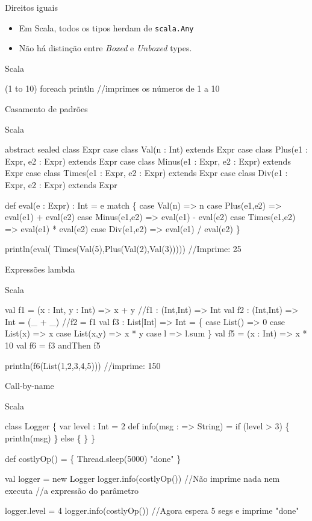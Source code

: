 \documentclass[12pt]{beamer}
\newenvironment{scala}{
\begin{block}{Scala} \begin{semiverbatim}
}{
\end{semiverbatim} \end{block}
}
\begin{document}
\begin{frame}[fragile]{Direitos iguais}
\begin{itemize}
\item Em Scala, todos os tipos herdam de \texttt{scala.Any}
\pause
\item Não há distinção entre \emph{Boxed} e \emph{Unboxed} types.
\end{itemize}
\pause
\begin{scala}
(1 to 10) foreach println
//imprimes os números de 1 a 10
\end{scala}
\end{frame}

\begin{frame}[fragile]{Casamento de padrões}
\scriptsize
\begin{scala}
abstract sealed class Expr
case class Val(n : Int) extends Expr
case class Plus(e1 : Expr, e2 : Expr) extends Expr
case class Minus(e1 : Expr, e2 : Expr) extends Expr
case class Times(e1 : Expr, e2 : Expr) extends Expr
case class Div(e1 : Expr, e2 : Expr) extends Expr

def eval(e : Expr) : Int = e match \{
  case Val(n) => n
  case Plus(e1,e2) => eval(e1) + eval(e2)
  case Minus(e1,e2) => eval(e1) - eval(e2)
  case Times(e1,e2) => eval(e1) * eval(e2)
  case Div(e1,e2) => eval(e1) / eval(e2)
\}

println(eval(
  Times(Val(5),Plus(Val(2),Val(3)))))
//Imprime: 25
\end{scala}
\end{frame}

\begin{frame}[fragile]{Expressões lambda}
\footnotesize
\begin{scala}
val f1 = (x : Int, y : Int) => x + y
//f1 : (Int,Int) => Int
val f2 : (Int,Int) => Int = (_ + _)
//f2 = f1
val f3 : List[Int] => Int = \{
   case List() => 0
   case List(x) => x
   case List(x,y) => x * y
   case l => l.sum
\}
val f5 = (x : Int) => x * 10
val f6 = f3 andThen f5

println(f6(List(1,2,3,4,5)))
//imprime: 150

\end{scala}
\end{frame}

\begin{frame}[fragile]{Call-by-name}
\scriptsize
\begin{scala}
class Logger \{
  var level : Int = 2
  def info(msg : => String) =
    if (level > 3) \{ println(msg) \} else \{ \}
\}

def costlyOp() = \{
  Thread.sleep(5000)
  "done"
\}

val logger = new Logger
logger.info(costlyOp())
//Não imprime nada nem executa 
//a expressão do parâmetro

logger.level = 4
logger.info(costlyOp())
//Agora espera 5 segs e imprime "done"
\end{scala}
\end{frame}
\end{document}
